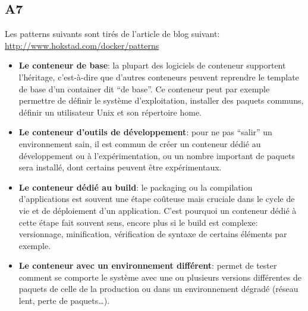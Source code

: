 \subsection*{A7}
    Les patterns suivants sont tirés de l'article de blog suivant: \url{http://www.hokstad.com/docker/patterns}
    \begin{itemize}
        \item \textbf{Le conteneur de base}: la plupart des logiciels de conteneur supportent l'héritage, c'est-à-dire que d'autres conteneurs peuvent reprendre le template de base d'un container dit \enquote{de base}. Ce conteneur peut par exemple permettre de définir le système d'exploitation, installer des paquets communs, définir un utilisateur Unix et son répertoire home.
        \item \textbf{Le conteneur d'outils de développement}: pour ne pas \enquote{salir} un environnement sain, il est commun de créer un conteneur dédié au développement ou à l'expérimentation, ou un nombre important de paquets sera installé, dont certains peuvent être expérimentaux.
        \item \textbf{Le conteneur dédié au build}: le packaging ou la compilation d'applications est souvent une étape coûteuse mais cruciale dans le cycle de vie et de déploiement d'un application. C'est pourquoi un conteneur dédié à cette étape fait souvent sens, encore plus si le build est complexe: versionnage, minification, vérification de syntaxe de certains éléments par exemple.
        \item \textbf{Le conteneur avec un environnement différent}: permet de tester comment se comporte le système avec une ou plusieurs versions différentes de paquets de celle de la production ou dans un environnement dégradé (réseau lent, perte de paquets\dots).
    \end{itemize}
